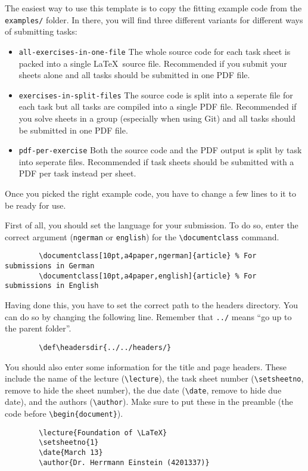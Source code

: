 \documentclass[10pt,a4paper,english]{article}
\author{Robert Pietsch (\href{mailto:robert.pietsch@uni-saarland.de}{robert.pietsch@uni-saarland.de})}
\def\headersdir{../headers/}
\begin{document}
    \maketitle

    The easiest way to use this template is to copy the fitting example code from the \verb|examples/| folder.
    In there, you will find three different variants for different ways of submitting tasks:

    \begin{itemize}
        \item \verb|all-exercises-in-one-file| The whole source code for each task sheet is packed into a single \LaTeX~source file.
        Recommended if you submit your sheets alone and all tasks should be submitted in one PDF file.
        \item \verb|exercises-in-split-files| The source code is split into a seperate file for each task but all tasks are compiled into a single PDF file.
        Recommended if you solve sheets in a group (especially when using Git) and all tasks should be submitted in one PDF file. 
        \item \verb|pdf-per-exercise| Both the source code and the PDF output is split by task into seperate files.
        Recommended if task sheets should be submitted with a PDF per task instead per sheet.
    \end{itemize}

    Once you picked the right example code, you have to change a few lines to it to be ready for use.

    First of all, you should set the language for your submission.
    To do so, enter the correct argument (\verb|ngerman| or \verb|english|) for the \verb|\documentclass| command.
    \begin{verbatim}
        \documentclass[10pt,a4paper,ngerman]{article} % For submissions in German
        \documentclass[10pt,a4paper,english]{article} % For submissions in English
    \end{verbatim}

    Having done this, you have to set the correct path to the headers directory. 
    You can do so by changing the following line.
    Remember that \verb|../| means \enquote{go up to the parent folder}.
    \begin{verbatim}
        \def\headersdir{../../headers/}
    \end{verbatim}

    You should also enter some information for the title and page headers.
    These include the name of the lecture (\verb|\lecture|), 
    the task sheet number (\verb|\setsheetno|, remove to hide the sheet number), 
    the due date (\verb|\date|, remove to hide due date),
    and the authors (\verb|\author|). 
    Make sure to put these in the preamble (the code before \verb|\begin{document}|).
    \begin{verbatim}
        \lecture{Foundation of \LaTeX}
        \setsheetno{1}
        \date{March 13}
        \author{Dr. Herrmann Einstein (4201337)}
    \end{verbatim}
\end{document}
